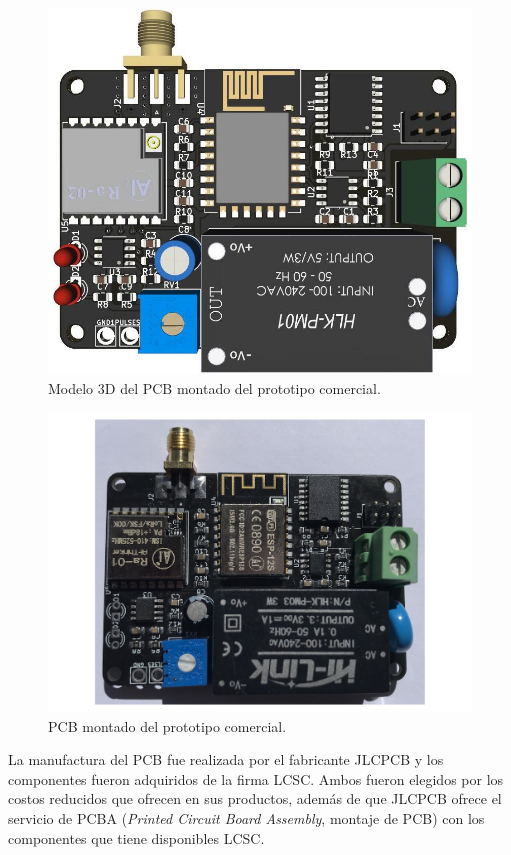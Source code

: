 \begin{figure}[h]
	\centering
	\includegraphics[scale=0.375	]{./Figures/pcb_3d.jpg}
	\caption{Modelo 3D del PCB montado del prototipo comercial.}
		\label{fig:pcb3D}
\end{figure}

\begin{figure}[h]
	\centering
	\includegraphics[scale=0.5	]{./Figures/pcb_real.pdf}
	\caption{PCB montado del prototipo comercial.}
		\label{fig:pcbReal}
\end{figure}

La manufactura del PCB fue realizada por el fabricante JLCPCB y los componentes fueron adquiridos de la firma LCSC. Ambos fueron elegidos por los costos reducidos que ofrecen en sus productos, además de que JLCPCB ofrece el servicio de PCBA (\textit{Printed Circuit Board Assembly}, montaje de PCB) con los componentes que tiene disponibles LCSC.
